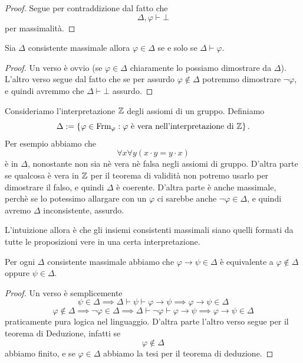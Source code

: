 \documentclass[11pt]{scrartcl}
\begin{document}
 	\begin{proof}
 		Segue per contraddizione dal fatto che 
 		$$\Delta,\varphi\vdash \bot$$
 		per massimalità.
 	\end{proof}
 	\begin{lemma}
 		Sia $\Delta$ consistente massimale allora $\varphi\in \Delta$ se e solo se $\Delta\vdash \varphi$.
 	\end{lemma}
 	\begin{proof}
 		Un verso è ovvio (se $\varphi\in \Delta$ chiaramente lo possiamo dimostrare da $\Delta$). L'altro verso segue dal fatto che se per assurdo $\varphi\not\in \Delta$ potremmo dimostrare $\lnot\varphi$, e quindi avremmo che $\Delta\vdash\bot$ assurdo.
 	\end{proof}
 	\begin{example}
 		Consideriamo l'interpretazione $\mathbb Z$ degli assiomi di un gruppo. Definiamo
 		$$\Delta:=\left\{\varphi\in \text{Frm}_\varphi:\text{$\varphi$ è vera nell'interpretazione di $\mathbb Z$}\right\}.$$
 		Per esempio abbiamo che
 		$$\forall x \forall y \left(x\cdot y = y \cdot x\right)$$
 		è in $\Delta$, nonostante non sia nè vera nè falsa negli assiomi di gruppo. D'altra parte se qualcosa è vera in $\mathbb Z$ per il teorema di validità non potremo usarlo per dimostrare il falso, e quindi $\Delta$ è coerente. D'altra parte è anche massimale, perchè se lo potessimo allargare con un $\varphi$ ci sarebbe anche $\lnot\varphi\in \Delta$, e quindi avremo $\Delta$ inconsistente, assurdo.
 	\end{example}
 	L'intuizione allora è che gli insiemi consistenti massimali siano quelli formati da tutte le proposizioni vere in una certa interpretazione.
 	\begin{lemma}
 		Per ogni $\Delta$ consistente massimale abbiamo che $\varphi\to \psi\in \Delta$ è equivalente a $\varphi\not\in \Delta$ oppure $\psi\in \Delta$.
 	\end{lemma}
 	\begin{proof}
 		Un verso è semplicemente 
 		$$\psi\in \Delta \implies \Delta\vdash \psi \vdash \varphi\to \psi \implies \varphi \to \psi \in \Delta$$
 		$$\varphi\not \in \Delta \implies \lnot\varphi \in \Delta \implies \Delta \vdash \lnot\varphi \vdash \varphi\to \psi \implies \varphi\to \psi \in \Delta$$
 		praticamente pura logica nel linguaggio. D'altra parte l'altro verso segue per il teorema di Deduzione, infatti se 
 		$$\varphi\not\in \Delta$$
 		abbiamo finito, e se $\varphi\in \Delta$ abbiamo la tesi per il teorema di deduzione.
 	\end{proof}
\end{document}
